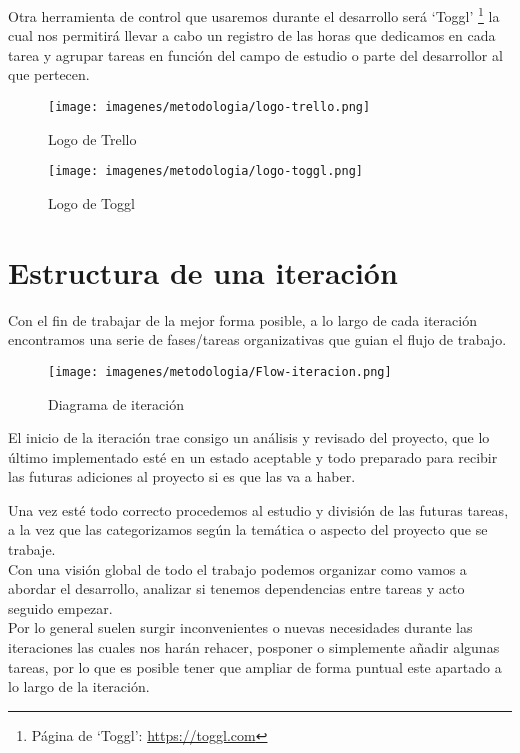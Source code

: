 Otra herramienta de control que usaremos durante el desarrollo será `Toggl'
\footnote{Página de `Toggl':  \url{https://toggl.com}}
la cual nos permitirá llevar a cabo un registro de las horas que dedicamos en cada tarea
y agrupar tareas en función del campo de estudio o parte del desarrollor al que pertecen.

\begin{figure}[ht]
\centering
\texttt{[image: imagenes/metodologia/logo-trello.png]}
\caption{Logo de Trello}
\label{img:trello}
\end{figure}

\begin{figure}[htb]
\centering
\texttt{[image: imagenes/metodologia/logo-toggl.png]}
\caption{Logo de Toggl}
\label{img:toggl}
\end{figure}

\section{Estructura de una iteración}
Con el fin de trabajar de la mejor forma posible, a lo largo de cada iteración encontramos una 
serie de fases/tareas organizativas que guian el flujo de trabajo.    

\begin{figure}[hbt]
\centering
\texttt{[image: imagenes/metodologia/Flow-iteracion.png]}
\caption{Diagrama de iteración}
\label{img:fases_it}
\end{figure}

El inicio de la iteración trae consigo un análisis y revisado del proyecto, que lo último
implementado esté en un estado aceptable y todo preparado para recibir las futuras adiciones
al proyecto si es que las va a haber.

Una vez esté todo correcto procedemos al estudio y división de las futuras tareas, a la vez 
que las categorizamos según la temática o aspecto del proyecto que se trabaje. \\
Con una visión global de todo el trabajo podemos organizar como vamos a
abordar el desarrollo, analizar si tenemos dependencias entre tareas y acto seguido empezar. \\
Por lo general suelen surgir inconvenientes o nuevas necesidades durante las iteraciones las
cuales nos harán rehacer, posponer o simplemente añadir algunas tareas, por lo que es posible
tener que ampliar de forma puntual este apartado a lo largo de la iteración.

